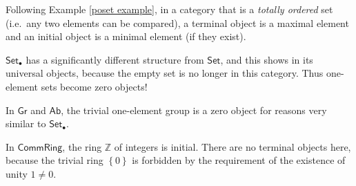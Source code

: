 \documentclass[english,letterpaper]{article}%
\numberwithin{equation}{section}
\numberwithin{figure}{section}
\numberwithin{table}{section}
\theoremstyle{definition}
\theoremstyle{definition}
\theoremstyle{definition}
\theoremstyle{plain}
\theoremstyle{plain}
\theoremstyle{plain}
\theoremstyle{plain}
\theoremstyle{remark}
\theoremstyle{remark}
\begin{document}
\begin{example}
Following Example \ref{poset example}, in a category that is a \emph{totally ordered} set (i.e.\ any two elements can be compared), a terminal object is a maximal element and an initial object is a minimal element (if they exist).
\end{example}
%
\begin{example}
$\mathsf{Set}_{\bullet}$ has a significantly different structure
from $\mathsf{Set}$, and this shows in its universal objects, because
the empty set is no longer in this category. Thus one-element sets
become zero objects!
\end{example}
%
\begin{example}
In $\mathsf{Gr}$ and $\mathsf{Ab}$, the trivial one-element group
is a zero object for reasons very similar to $\mathsf{Set}_{\bullet}$.
\end{example}
%
\begin{example}
In $\mathsf{CommRing}$, the ring $\mathbb{Z}$ of integers is initial.
There are no terminal objects here, because the trivial ring $\left\{ 0\right\} $
is forbidden by the requirement of the existence of unity $1\neq0$.
\end{example}
%
\end{document}
